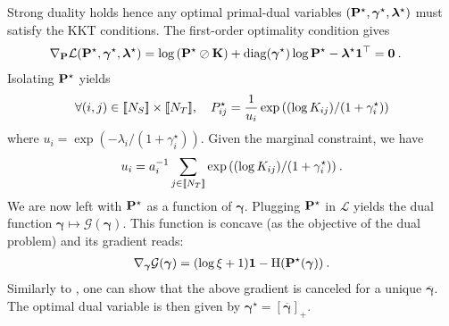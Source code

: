     Strong duality holds hence any optimal primal-dual variables $({\mathbf{P}}^\star, \bm{\gamma}^\star, \bm{\lambda}^\star)$ must satisfy the KKT conditions. The first-order optimality condition gives
    \begin{align}
        \nabla_{{\mathbf{P}}} \mathcal{L} ({\mathbf{P}}^\star, \bm{\gamma}^\star, \bm{\lambda}^\star) &= \log \left( {\mathbf{P}}^\star \oslash {\mathbf{K}} \right) + \operatorname{diag}(\bm{\gamma}^\star)\log{{\mathbf{P}}^\star} - \bm{\lambda}^\star \bm{1}^\top = \bm{0} \:.
    \end{align}
    Isolating ${\mathbf{P}}^\star$ yields
    \begin{align}
        \forall (i,j) \in {[\![N_S]\!]} \times {[\![N_T]\!]}, \quad P^\star_{ij} = \frac{1}{u_i} \exp{((\log K_{ij})/(1 + \gamma^\star_i))}
    \end{align}
    where $u_i = \exp{(-\lambda_i/(1 + \gamma^\star_i))}$. Given the marginal constraint, we have 
    \begin{equation}
        u_i = a_i^{-1} \sum_{j \in {[\![N_T]\!]}} \exp{((\log K_{ij})/(1 + \gamma^\star_i))} \:.
    \end{equation}
    We are now left with ${\mathbf{P}}^\star$ as a function of $\bm{\gamma}$. Plugging ${\mathbf{P}}^\star$ in $\mathcal{L}$ yields the dual function $\bm{\gamma} \mapsto \mathcal{G}(\bm{\gamma})$. This function is concave (as the objective of the dual problem) and its gradient reads:
    \begin{align}
        \nabla_{\bm{\gamma}} \mathcal{G}(\bm{\gamma}) = (\log \xi + 1 )\bm{1} - \operatorname{H}({\mathbf{P}}^\star(\bm{\gamma})) \:.
    \end{align}
    Similarly to \citep{van2023snekhorn}, one can show that the above gradient is canceled for a unique $\overline{\bm{\gamma}}$. The optimal dual variable is then given by $\bm{\gamma}^\star = [\overline{\bm{\gamma}}]_+$.
    

